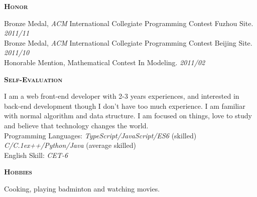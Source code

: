 \documentclass[a4paper]{article}
\newenvironment{changemargin}[2]{%
  \begin{list}{}{%
    \setlength{\topsep}{0pt}%
    \setlength{\leftmargin}{#1}%
    \setlength{\rightmargin}{#2}%
    \setlength{\listparindent}{\parindent}%
    \setlength{\itemindent}{\parindent}%
    \setlength{\parsep}{\parskip}%
  }%
  \item[]}{\end{list}
}
\newcommand{\lineover}{
	\begin{changemargin}{-0.05in}{-0.05in}
		\vspace*{-8pt}
		\hrulefill \\
		\vspace*{-2pt}
	\end{changemargin}
}
\newcommand{\header}[1]{
	\begin{changemargin}{-0.5in}{-0.5in}
		\scshape{\textbf{#1}}\\
	\end{changemargin}
}
\newenvironment{body} {
	\vspace*{-16pt}
	\begin{changemargin}{-0.25in}{-0.5in}
  }	
	{\end{changemargin}
}
\begin{document}
\medskip

\header{Honor}
\begin{body}
	\vspace{14pt}
	Bronze Medal, \emph{ACM} International Collegiate Programming Contest Fuzhou Site. \hfill \emph{2011/11}\\
	Bronze Medal, \emph{ACM} International Collegiate Programming Contest Beijing Site. \hfill \emph{2011/10}\\
	Honorable Mention, Mathematical Contest In Modeling. \hfill \emph{2011/02}\\
\end{body}

\medskip


\header{Self-Evaluation}

\begin{body}
	\vspace{14pt}
	I am a web front-end developer with 2-3 years experiences, and interested in back-end development though I don't have too much experience. I am familiar with normal algorithm and data structure. I am focused on things, love to study and believe that technology changes the world.\\
	Programming Languages: \emph{TypeScript/JavaScript/ES6} (skilled) \emph{C/C\raise.1ex\hbox{\small++}/Python/Java} {(average skilled)} \\
	English Skill: \emph{CET-6}\\
\end{body}

\medskip


\header{Hobbies}

\begin{body}
	\vspace{14pt}
	Cooking, playing badminton and watching movies.\\
\end{body}
\end{document}
